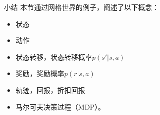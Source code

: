 \begin{frame}{小结}
    本节通过网格世界的例子，阐述了以下概念：
    \begin{itemize}
        \item 状态
        \item 动作
        \item 状态转移，状态转移概率$p(s'|s, a)$
        \item 奖励，奖励概率$p(r|s,a)$
        \item 轨迹，回报，折扣回报
        \item 马尔可夫决策过程（MDP）。
    \end{itemize}
\end{frame}
